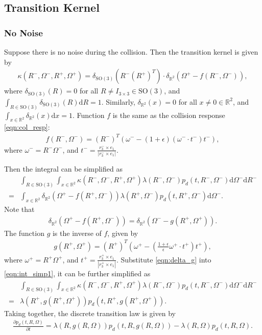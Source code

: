 \documentclass[10pt]{article}
\newcommand{\SO}{\ensuremath{\mathrm{SO}(3)}}
\newcommand{\diff}[1]{\mathrm{d}#1}
\newcommand{\real}{\ensuremath{\mathbb{R}}}
\begin{document}
\subsection{Transition Kernel}

\subsubsection{No Noise}
Suppose there is no noise during the collision.
Then the transition kernel is given by
\begin{align}
	\kappa(R^-,\Omega^-,R^+,\Omega^+) = \delta_{\SO} \left( R^-(R^+)^T \right) \cdot \delta_{\real^2}(\Omega^+ - f(R^-,\Omega^-)),
\end{align}
where $\delta_{\SO}(R) = 0$ for all $R \neq I_{3\times 3} \in\SO$, and $\int_{R\in\SO} \delta_{\SO}(R) \diff{R} = 1$.
Similarly, $\delta_{\real^2}(x) = 0$ for all $x \neq 0 \in\real^2$, and $\int_{x\in\real^2} \delta_{\real^2}(x) \diff{x} = 1$.
Function $f$ is the same as the collision response \eqref{eqn:col_resp}:
\begin{align}
	f(R^-,\Omega^-) = (R^-)^T\left( \omega^- - (1+\epsilon)(\omega^- \cdot t^-) t^- \right),
\end{align}
where $\omega^- = R^-\Omega^-$, and $t^- = \frac{r_3^- \times e_1}{|r_3^- \times e_1|}$.

Then the integral can be simplified as
\begin{align} \label{eqn:int_simp1}
	&\int_{R\in\SO} \int_{x\in\real^2} \kappa(R^-,\Omega^-,R^+,\Omega^+) \lambda(R^-,\Omega^-) p_d(t,R^-,\Omega^-) \diff{\Omega^-} \diff{R^-} \nonumber \\
	= &\int_{x\in\real^2} \delta_{\real^2} (\Omega^+ - f(R^+,\Omega^-)) \lambda(R^+,\Omega^-) p_d(t,R^+,\Omega^-) \diff{\Omega^-}.
\end{align}
Note that
\begin{align} \label{eqn:delta_g}
	\delta_{\real^2} (\Omega^+ - f(R^+,\Omega^-)) = \delta_{\real^2} (\Omega^- - g(R^+,\Omega^+)).
\end{align}
The function $g$ is the inverse of $f$, given by
\begin{align}
	g(R^+,\Omega^+) = (R^+)^T \left( \omega^+ - \left( \frac{1+\epsilon}{\epsilon} \omega^+ \cdot t^+ \right) t^+ \right),
\end{align}
where $\omega^+ = R^+\Omega^+$, and $t^+ = \frac{r^+_3 \times e_1}{|r^+_3 \times e_1|}$.
Substitute \eqref{eqn:delta_g} into \eqref{eqn:int_simp1}, it can be further simplified as
\begin{align}
	&\int_{R\in\SO} \int_{x\in\real^2} \kappa(R^-,\Omega^-,R^+,\Omega^+) \lambda(R^-,\Omega^-) p_d(t,R^-,\Omega^-) \diff{\Omega^-} \diff{R^-} \nonumber \\
	= &\lambda(R^+,g(R^+,\Omega^+)) p_d(t,R^+,g(R^+,\Omega^+)).
\end{align}
Taking together, the discrete transition law is given by
\begin{align}
	\frac{\partial p_d(t,R,\Omega)}{\partial t} = \lambda(R,g(R,\Omega)) p_d(t,R,g(R,\Omega)) - \lambda(R,\Omega) p_d(t,R,\Omega).
\end{align}
\end{document}
